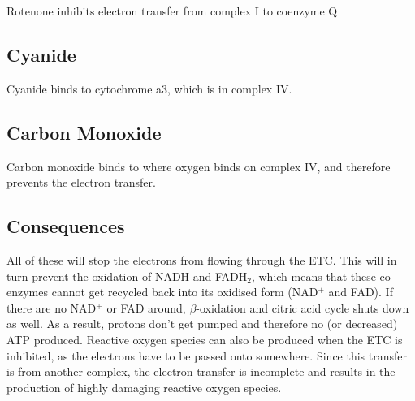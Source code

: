 Rotenone inhibits electron transfer from complex I to coenzyme Q

\subsection{Cyanide}

Cyanide binds to cytochrome a3, which is in complex IV.

\subsection{Carbon Monoxide}

Carbon monoxide binds to where oxygen binds on complex IV, and therefore prevents the electron transfer.

\subsection{Consequences}

All of these will stop the electrons from flowing through the ETC.
This will in turn prevent the oxidation of NADH and FADH$_2$, which means that these co-enzymes cannot get recycled back into its oxidised form (NAD$^+$ and FAD).
If there are no NAD$^+$ or FAD around, $\beta$-oxidation and citric acid cycle shuts down as well.
As a result, protons don't get pumped and therefore no (or decreased) ATP produced.
Reactive oxygen species can also be produced when the ETC is inhibited, as the electrons have to be passed onto somewhere.
Since this transfer is from another complex, the electron transfer is incomplete and results in the production of highly damaging reactive oxygen species.

